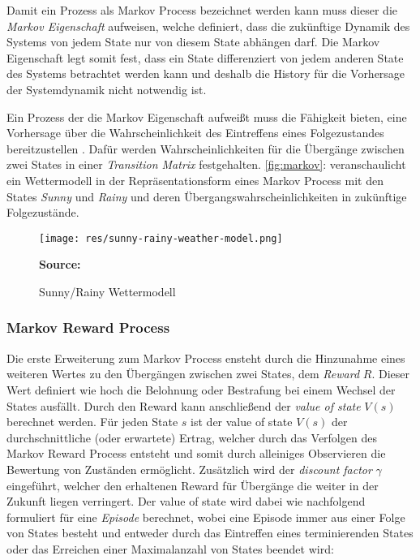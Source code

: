 \documentclass[11pt]{scrartcl}
\newcommand{\source}[1]{\vspace{-5pt} \caption*{\hfill \textbf{Source:} {#1}} }
\begin{document}
Damit ein Prozess als Markov Process bezeichnet werden kann muss dieser die \textit{Markov Eigenschaft}
aufweisen, welche definiert, dass die zukünftige Dynamik des Systems von jedem State nur
von diesem State abhängen darf. Die Markov Eigenschaft legt somit fest, dass ein State
differenziert von jedem anderen State des Systems betrachtet werden kann und deshalb die
History für die Vorhersage der Systemdynamik nicht notwendig ist.

Ein Prozess der die Markov Eigenschaft aufweißt muss die Fähigkeit bieten, eine Vorhersage über
die Wahrscheinlichkeit des Eintreffens eines Folgezustandes bereitzustellen \cite[~S.12 f.]{L2018}. 
Dafür werden Wahrscheinlichkeiten für die Übergänge zwischen zwei States in einer
\textit{Transition Matrix} festgehalten. \autoref{fig:markov}: 
veranschaulicht ein Wettermodell in der Repräsentationsform eines Markov Process mit den States
\textit{Sunny} und \textit{Rainy} und deren Übergangswahrscheinlichkeiten in zukünftige
Folgezustände.

\begin{figure}[htp]
\centering
\texttt{[image: res/sunny-rainy-weather-model.png]}
\caption{Sunny/Rainy Wettermodell}
\source{\cite[~S.13 - Chapter 1 - Figure 4]{L2018}}
\label{fig:markov}
\end{figure}


\subsubsection{Markov Reward Process}
\label{sec:markov_reward_process}
Die erste Erweiterung zum Markov Process ensteht durch die Hinzunahme eines weiteren Wertes zu den 
Übergängen zwischen zwei States, dem \textit{Reward} $R$. Dieser Wert definiert wie hoch die Belohnung
oder Bestrafung bei einem Wechsel der States ausfällt. Durch den Reward kann anschließend der
\textit{value of state} $V(s)$ berechnet werden. Für jeden State $s$ ist der value of state $V(s)$
der durchschnittliche (oder erwartete) Ertrag, welcher durch das Verfolgen des Markov Reward Process
entsteht und somit durch alleiniges Observieren die Bewertung von Zuständen ermöglicht.
Zusätzlich wird der \textit{discount factor} $\gamma$ eingeführt, welcher den erhaltenen Reward
für Übergänge die weiter in der Zukunft liegen verringert. Der value of state wird dabei wie
nachfolgend formuliert für eine \textit{Episode} berechnet, wobei eine Episode immer aus einer
Folge von States besteht und entweder durch das Eintreffen eines terminierenden States oder das
Erreichen einer Maximalanzahl von States beendet wird:
\end{document}

